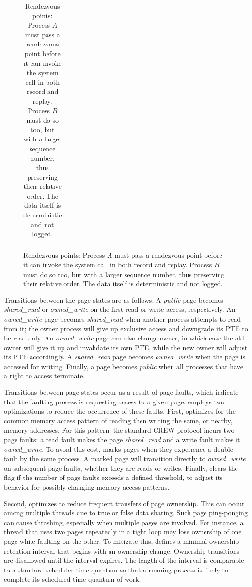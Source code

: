 \begin{table}[]
\begin{figure}[t]
\begin{center}
\begin{tabular}{lll|l}
    \hline	

  \end{tabular}
  \end{center}

  \caption{Rendezvous points:
    {
      Process $A$ must pass a rendezvous point before it can invoke
      the system call in both record and replay. Process $B$ must do
      so too, but with a larger sequence number, thus preserving their
      relative order. The data itself is deterministic and not logged.
    }
  }
  \label{scribe:fig:rendezvous}
\end{figure}

Transitions between the page states are as follows. A {\em public} page
becomes {\em shared\_read} or {\em owned\_write} on the first read or
write access, respectively. An {\em owned\_write} page becomes {\em
shared\_read} when another process attempts to read from it; the owner
process will give up exclusive access and downgrade its PTE to be
read-only. An {\em owned\_write} page can also change owner, in which
case the old owner will give it up and invalidate its own PTE, while
the new owner will adjust its PTE accordingly. A {\em shared\_read}
page becomes {\em owned\_write} when the page is accessed for writing.
Finally, a page becomes {\em public} when all processes that have a
right to access terminate.  

Transitions between page states occur as a result of page faults,
which indicate that the faulting process is requesting access to a
given page.  \scribe{} employs two optimizations to reduce the
occurrence of these faults.  First, \scribe{} optimizes for the
common memory access pattern of reading then writing the same, or
nearby, memory addresses.  For this pattern, the standard CREW protocol
incurs two page faults: a read fault makes the page {\em shared\_read}
and a write fault makes it {\em owned\_write}. To avoid this cost,
\scribe{} marks pages when they experience a double fault by the same
process. A marked page will transition directly to {\em owned\_write}
on subsequent page faults, whether they are reads or writes. Finally,
\scribe{} clears the flag if the number of page faults exceeds a defined
threshold, to adjust its behavior for possibly changing memory access
patterns.  

Second, \scribe{} optimizes to reduce frequent transfers of page
ownership.  This can occur among multiple threads due to true or
false data sharing.  Such page ping-ponging can cause 
thrashing, especially when multiple pages are involved.  For instance,
a thread that uses two pages repeatedly in a tight loop may
lose ownership of one page while faulting on the other. To
mitigate this, \scribe{} defines a minimal ownership retention
interval that begins with an ownership change.  Ownership transitions
are disallowed until the interval expires.
The length
of the interval is comparable to a standard scheduler time quantum so
that a running process is likely to
complete its scheduled
time quantum of work.


\end{table}
